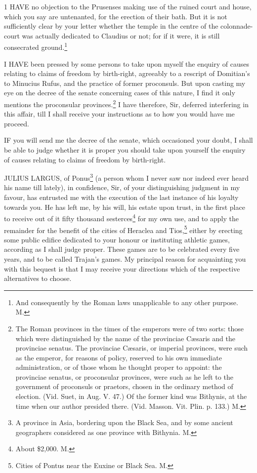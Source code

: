 
1 HAVE no objection to the Prusenses making use of the ruined court and
house, which you say are untenanted, for the erection of their bath. But
it is not sufficiently clear by your letter whether the temple in the
centre of the colonnade-court was actually dedicated to Claudius or not;
for if it were, it is still consecrated ground.\footnote{And consequently by
the Roman laws unapplicable to any other purpose. M.}


I HAVE been pressed by some persons to take upon myself the enquiry of
causes relating to claims of freedom by birth-right, agreeably to a
rescript of Domitian's to Minucius Rufus, and the practice of former
proconsuls. But upon casting my eye on the decree of the senate concerning
cases of this nature, I find it only mentions the proconsular provinces.\footnote{The Roman provinces
in the times of the emperors were of two sorts: those which were
distinguished by the name of the provinciae Cæsaris and the provinciae
senatus. The provinciae Cæsaris, or imperial provinces, were such as the
emperor, for reasons of policy, reserved to his own immediate
administration, or of those whom he thought proper to appoint: the
provinciae senatus, or proconsular provinces, were such as he left to the
government of proconsuls or praetors, chosen in the ordinary method of
election. (Vid. Suet, in Aug. V. 47.) Of the former kind was Bithynis, at
the time when our author presided there. (Vid. Masson. Vit. Plin. p. 133.)
M.}
I have therefore, Sir, deferred interfering in this affair, till I shall
receive your instructions as to how you would have me proceed.


IF you will send me the decree of the senate, which occasioned your doubt,
I shall be able to judge whether it is proper you should take upon
yourself the enquiry of causes relating to claims of freedom by
birth-right.


JULIUS LARGUS, of Ponus\footnote{A province in Asia,
bordering upon the Black Sea, and by some ancient geographers considered
as one province with Bithynia. M.} (a person whom I never saw nor indeed
ever heard his name till lately), in confidence, Sir, of your
distinguishing judgment in my favour, has entrusted me with the execution
of the last instance of his loyalty towards you. He has left me, by his
will, his estate upon trust, in the first place to receive out of it fifty
thousand sesterces\footnote{About \$2,000. M.} for my own use, and to apply the
remainder for the benefit of the cities of Heraclea and Tios,\footnote{Cities of Pontus near
the Euxine or Black Sea. M.}
either by erecting some public edifice dedicated to your honour or
instituting athletic games, according as I shall judge proper. These games
are to be celebrated every five years, and to be called Trajan's games. My
principal reason for acquainting you with this bequest is that I may
receive your directions which of the respective alternatives to choose.

